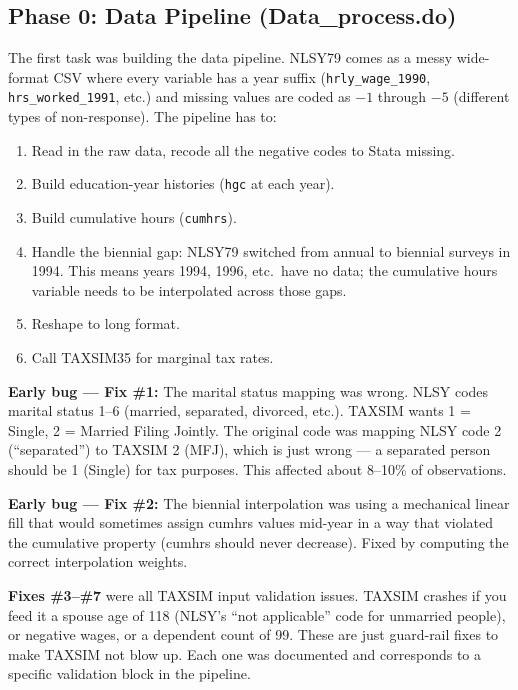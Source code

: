 \documentclass[11pt, letterpaper]{article}
\newcommand{\codebox}[1]{\texttt{\small #1}}
\begin{document}
\subsection{Phase 0: Data Pipeline (Data\_process.do)}

The first task was building the data pipeline. NLSY79 comes as a messy wide-format CSV where every variable has a year suffix (\codebox{hrly\_wage\_1990}, \codebox{hrs\_worked\_1991}, etc.) and missing values are coded as $-1$ through $-5$ (different types of non-response). The pipeline has to:
\begin{enumerate}
    \item Read in the raw data, recode all the negative codes to Stata missing.
    \item Build education-year histories (\codebox{hgc} at each year).
    \item Build cumulative hours (\codebox{cumhrs}).
    \item Handle the biennial gap: NLSY79 switched from annual to biennial surveys in 1994. This means years 1994, 1996, etc.\ have no data; the cumulative hours variable needs to be interpolated across those gaps.
    \item Reshape to long format.
    \item Call TAXSIM35 for marginal tax rates.
\end{enumerate}

\textbf{Early bug --- Fix \#1:} The marital status mapping was wrong. NLSY codes marital status 1--6 (married, separated, divorced, etc.). TAXSIM wants 1 = Single, 2 = Married Filing Jointly. The original code was mapping NLSY code 2 (``separated'') to TAXSIM 2 (MFJ), which is just wrong --- a separated person should be 1 (Single) for tax purposes. This affected about 8--10\% of observations.

\textbf{Early bug --- Fix \#2:} The biennial interpolation was using a mechanical linear fill that would sometimes assign cumhrs values mid-year in a way that violated the cumulative property (cumhrs should never decrease). Fixed by computing the correct interpolation weights.

\textbf{Fixes \#3--\#7} were all TAXSIM input validation issues. TAXSIM crashes if you feed it a spouse age of 118 (NLSY's ``not applicable'' code for unmarried people), or negative wages, or a dependent count of 99. These are just guard-rail fixes to make TAXSIM not blow up. Each one was documented and corresponds to a specific validation block in the pipeline.
\end{document}
